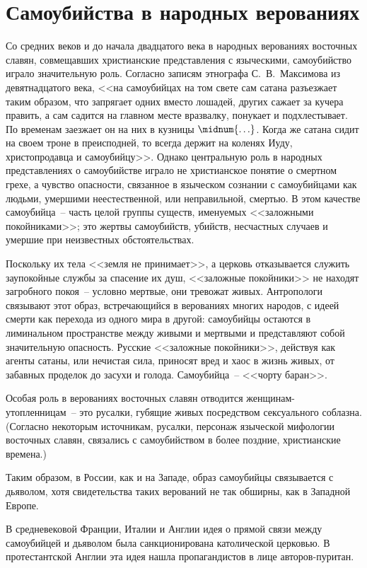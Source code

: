 \documentclass[pscyr,titlepage]{hedreport}
\begin{document}
  \section{Самоубийства в народных верованиях} Со средних веков и до начала
  двадцатого века в народных верованиях восточных славян, совмещавших
  христианские представления с языческими, самоубийство играло значительную
  роль. Согласно записям этнографа С.~В.~Максимова из девятнадцатого века, <<на
  самоубийцах на том свете сам сатана разъезжает таким образом, что запрягает
  одних вместо лошадей, других сажает за кучера править, а сам садится на
  главном месте вразвалку, понукает и подхлестывает. По временам заезжает он на
  них в кузницы \( \midnum{\ldots} \). Когда же сатана сидит на своем троне в
  преисподней, то всегда держит на коленях Иуду, христопродавца и самоубийцу>>.
  Однако центральную роль в народных представлениях о самоубийстве играло не
  христианское понятие о смертном грехе, а чувство опасности, связанное в
  языческом сознании с самоубийцами как людьми, умершими неестественной, или
  неправильной, смертью. В этом качестве самоубийца~-- часть целой группы
  существ, именуемых <<заложными покойниками>>; это жертвы самоубийств, убийств,
  несчастных случаев и умершие при неизвестных обстоятельствах.

  Поскольку их тела <<земля не принимает>>, а церковь отказывается служить
  заупокойные службы за спасение их душ, <<заложные покойники>> не находят
  загробного покоя~-- условно мертвые, они тревожат живых. Антропологи связывают
  этот образ, встречающийся в верованиях многих народов, с идеей смерти как
  перехода из одного мира в другой: самоубийцы остаются в лиминальном
  пространстве между живыми и мертвыми и представляют собой значительную
  опасность. Русские <<заложные покойники>>, действуя как агенты сатаны, или
  нечистая сила, приносят вред и хаос в жизнь живых, от забавных проделок до
  засухи и голода. Самоубийца~-- <<чорту баран>>.

  Особая роль в верованиях восточных славян отводится женщинам-утопленницам~--
  это русалки, губящие живых посредством сексуального соблазна. (Согласно
  некоторым источникам, русалки, персонаж языческой мифологии восточных славян,
  связались с самоубийством в более поздние, христианские времена.)

  Таким образом, в России, как и на Западе, образ самоубийцы связывается с
  дьяволом, хотя свидетельства таких верований не так обширны, как в Западной
  Европе.

  В средневековой Франции, Италии и Англии идея о прямой связи между самоубийцей
  и дьяволом была санкционирована католической церковью. В протестантской Англии
  эта идея нашла пропагандистов в лице авторов-пуритан.
\end{document}
